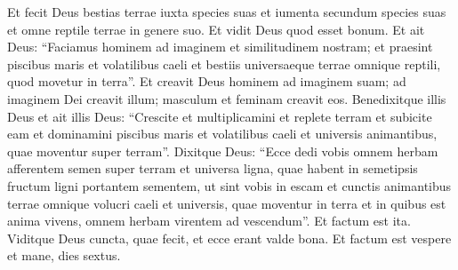 \begin{biblechapter}
\verse Et fecit Deus bestias terrae iuxta species suas et iumenta secundum species suas et omne reptile terrae in genere suo. Et vidit Deus quod esset bonum. 
\verse Et ait Deus: “Faciamus hominem ad imaginem et similitudinem nostram; et praesint piscibus maris et volatilibus caeli et bestiis universaeque terrae omnique reptili, quod movetur in terra”. 
\verse Et creavit Deus hominem ad imaginem suam; ad imaginem Dei creavit illum; masculum et feminam creavit eos. 
\verse Benedixitque illis Deus et ait illis Deus: “Crescite et multiplicamini et replete terram et subicite eam et dominamini piscibus maris et volatilibus caeli et universis animantibus, quae moventur super terram”. 
\verse Dixitque Deus: “Ecce dedi vobis omnem herbam afferentem semen super terram et universa ligna, quae habent in semetipsis fructum ligni portantem sementem, ut sint vobis in escam 
\verse et cunctis animantibus terrae omnique volucri caeli et universis, quae moventur in terra et in quibus est anima vivens, omnem herbam virentem ad vescendum”. Et factum est ita. 
\verse Viditque Deus cuncta, quae fecit, et ecce erant valde bona. Et factum est vespere et mane, dies sextus. 
\end{biblechapter}

